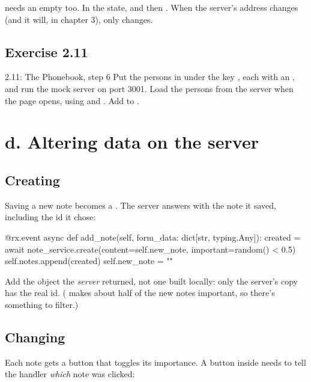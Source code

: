  needs an empty  too. In the state,  and then . When the server's address changes (and it will, in chapter 3), only  changes.

\subsection{Exercise 2.11}

\begin{exercise}{2.11: The Phonebook, step 6}
Put the persons in  under the key , each with an , and run the mock server on port 3001. Load the persons from the server when the page opens, using  and . Add  to .
\end{exercise}

\section{d. Altering data on the server}

\subsection{Creating}

Saving a new note becomes a . The server answers with the note it saved, including the id it chose:

\begin{py}
@rx.event
async def add_note(self, form_data: dict[str, typing.Any]):
	created = await note_service.create(content=self.new_note, important=random() < 0.5)
	self.notes.append(created)
	self.new_note = ""
\end{py}

Add the object the \emph{server} returned, not one built locally: only the server's copy has the real id. ( makes about half of the new notes important, so there's something to filter.)

\subsection{Changing}

Each note gets a button that toggles its importance. A button inside  needs to tell the handler \emph{which} note was clicked:


